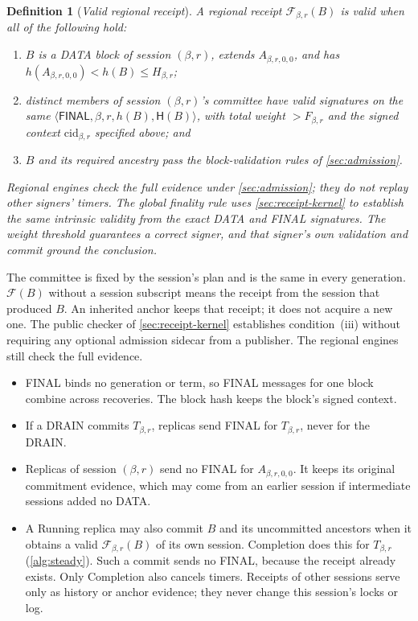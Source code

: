 \documentclass[11pt,a4paper]{article}
\newcommand{\FC}{\mathcal F}
\newcommand{\Hash}{\mathsf H}
\newcommand{\tagg}[1]{\ensuremath{\mathsf{#1}}}
\newcommand{\defterm}[1]{\textcolor{rrBlue}{\textit{#1}}}
\newtheorem{definition}{Definition}[section]
\begin{document}
\begin{definition}[\defterm{Valid regional receipt}]
\label{def:receipt}
A regional receipt $\FC_{\beta,r}(B)$ is valid when all of the following hold:
\begin{enumerate}[label=(\roman*)]
\item $B$ is a DATA block of session $(\beta,r)$, extends
$A_{\beta,r,0,0}$, and has $h(A_{\beta,r,0,0})<h(B)\le H_{\beta,r}$;
\item distinct members of session $(\beta,r)$'s committee have
valid signatures on the same
$\langle\tagg{FINAL},\beta,r,\allowbreak h(B),\Hash(B)\rangle$,
with total weight $>F_{\beta,r}$ and the signed context
$\mathrm{cid}_{\beta,r}$ specified above; and
\item $B$ and its required ancestry pass the block-validation rules of
\cref{sec:admission}.
\end{enumerate}
Regional engines check the full evidence under \cref{sec:admission};
they do not replay other signers' timers. The global finality rule uses
\cref{sec:receipt-kernel} to establish the same intrinsic validity from
the exact DATA and FINAL signatures. The weight threshold guarantees a
correct signer, and that signer's own validation and commit ground the
conclusion.
\end{definition}
The committee is fixed by the session's plan and is the same in every
generation. $\FC(B)$ without a session subscript means the receipt
from the session that produced $B$. An inherited anchor keeps that
receipt; it does not acquire a new one. The public checker of
\cref{sec:receipt-kernel} establishes condition~(iii) without requiring
any optional admission sidecar from a publisher. The regional engines
still check the full evidence.
\begin{itemize}
\item FINAL binds no generation or term, so FINAL messages for one block
combine across recoveries. The block hash keeps the block's signed
context.
\item If a DRAIN commits $T_{\beta,r}$, replicas send FINAL for
$T_{\beta,r}$, never for the DRAIN.
\item Replicas of session $(\beta,r)$ send no FINAL for $A_{\beta,r,0,0}$.
It keeps its original commitment evidence, which may come from an earlier
session if intermediate sessions added no DATA.
\item A Running replica may also commit $B$ and its uncommitted ancestors when it
obtains a valid $\FC_{\beta,r}(B)$ of its own session. Completion does
this for $T_{\beta,r}$ (\cref{alg:steady}). Such a commit sends no FINAL,
because the receipt already exists. Only Completion also cancels timers.
Receipts of other sessions serve only as history or anchor evidence;
they never change this session's locks or log.
\end{itemize}
\end{document}
